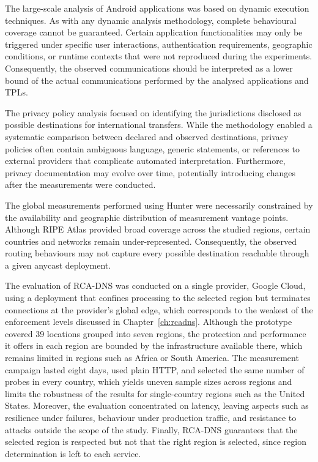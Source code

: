 The large-scale analysis of Android applications was based on dynamic execution techniques. As with any dynamic analysis methodology, complete behavioural coverage cannot be guaranteed. Certain application functionalities may only be triggered under specific user interactions, authentication requirements, geographic conditions, or runtime contexts that were not reproduced during the experiments. Consequently, the observed communications should be interpreted as a lower bound of the actual communications performed by the analysed applications and TPLs.

The privacy policy analysis focused on identifying the jurisdictions disclosed as possible destinations for international transfers. While the methodology enabled a systematic comparison between declared and observed destinations, privacy policies often contain ambiguous language, generic statements, or references to external providers that complicate automated interpretation. Furthermore, privacy documentation may evolve over time, potentially introducing changes after the measurements were conducted.

The global measurements performed using Hunter were necessarily constrained by the availability and geographic distribution of measurement vantage points. Although RIPE Atlas provided broad coverage across the studied regions, certain countries and networks remain under-represented. Consequently, the observed routing behaviours may not capture every possible destination reachable through a given anycast deployment.

The evaluation of RCA-DNS was conducted on a single provider, Google Cloud, using a deployment that confines processing to the selected region but terminates connections at the provider's global edge, which corresponds to the weakest of the enforcement levels discussed in Chapter~\ref{ch:rcadns}. Although the prototype covered 39 locations grouped into seven regions, the protection and performance it offers in each region are bounded by the infrastructure available there, which remains limited in regions such as Africa or South America. The measurement campaign lasted eight days, used plain HTTP, and selected the same number of probes in every country, which yields uneven sample sizes across regions and limits the robustness of the results for single-country regions such as the United States. Moreover, the evaluation concentrated on latency, leaving aspects such as resilience under failures, behaviour under production traffic, and resistance to attacks outside the scope of the study. Finally, RCA-DNS guarantees that the selected region is respected but not that the right region is selected, since region determination is left to each service.

